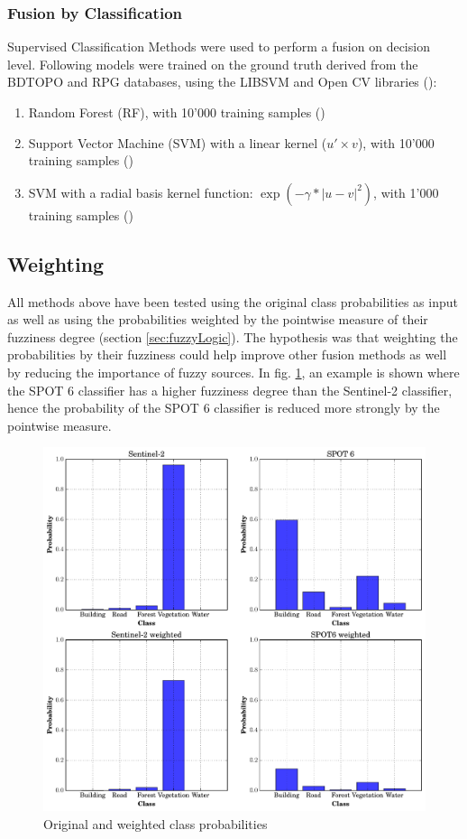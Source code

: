 \documentclass[10pt]{article}
\begin{document}
\subsubsection{Fusion by Classification}
Supervised Classification Methods were used to perform a fusion on decision level. Following models were trained on the ground truth derived from the BDTOPO and RPG databases, using the LIBSVM and Open CV libraries (\cite{bdtopo,RPG,libsvm,opencv}):
\begin{enumerate}
    \item Random Forest (RF), with 10'000 training samples (\cite{opencv})
    \item Support Vector Machine (SVM) with a linear kernel ($u'\times v$), with 10'000 training samples (\cite{libsvm})
    \item SVM with a radial basis kernel function: $\exp(-\gamma*|u-v|^2)$, with 1'000 training samples (\cite{libsvm})
\end{enumerate}

\subsection{Weighting}
All methods above have been tested using the original class probabilities as input  as well as using the probabilities weighted by the pointwise measure of their fuzziness degree (section \ref{sec:fuzzyLogic}). The hypothesis was that weighting the probabilities by their fuzziness could help improve other fusion methods as well by reducing the importance of fuzzy sources. In fig. \ref{fig:proba_point}, an example is shown where the SPOT 6 classifier has a higher fuzziness degree than the Sentinel-2 classifier, hence the probability of the SPOT 6 classifier is reduced more strongly by the pointwise measure.

\begin{figure}[H]
    \centering
    \includegraphics[width=.7\textwidth]{proba_point}
    \caption{Original and weighted class probabilities}
    \label{fig:proba_point}
\end{figure}
\end{document}
